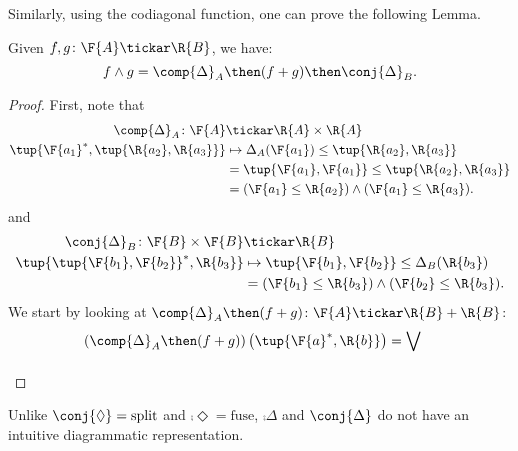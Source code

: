 \noindent Similarly, using the codiagonal function, one can prove the following Lemma.
\begin{lemma}
    Given $f, g\colon \F{A} \tickar \R{B}$, we have:
    \begin{equation}
        f \wedge g = \comp{\Delta}_A \then(f + g) \then \conj{\Delta}_B.
    \end{equation}
\end{lemma}
\begin{proof}
First, note that
\begin{equation}
    \begin{aligned}
    \comp{\Delta}_A \colon \F{A}&\tickar \R{A}\times \R{A}\\
    \tup{\F{a_1}^*,\tup{\R{a_2},\R{a_3}}}&\mapsto \Delta_A(\F{a_1})\leq \tup{\R{a_2},\R{a_3}}\\
    &= \tup{\F{a_1},\F{a_1}}\leq \tup{\R{a_2},\R{a_3}}\\
    &= (\F{a_1}\leq \R{a_2}) \wedge (\F{a_1}\leq \R{a_3}).
    \end{aligned}
\end{equation}
and 
\begin{equation}
    \begin{aligned}
    \conj{\Delta}_B \colon \F{B}\times \F{B}&\tickar \R{B}\\
    \tup{\tup{\F{b_1},\F{b_2}}^*,\R{b_3}}&\mapsto \tup{\F{b_1},\F{b_2}}\leq \Delta_B(\R{b_3})\\
    &= (\F{b_1}\leq \R{b_3}) \wedge (\F{b_2}\leq \R{b_3}).
    \end{aligned}
\end{equation}
We start by looking at $\comp{\Delta}_A \then (f+g) \colon \F{A}\tickar \R{B}+\R{B}$:
\begin{equation}
    \begin{aligned}
    \left(\comp{\Delta}_A\then (f+g)\right)\left(\tup{\F{a}^*,\R{b}}\right)&=\bigvee_{}
    \end{aligned}
\end{equation}
\end{proof}
Unlike $\conj{\Diamond} = \text{split}$ and $\comp{\Diamond} = \text{fuse}$, $\comp{\Delta}$ and $\conj{\Delta}$ do not have an intuitive diagrammatic representation.